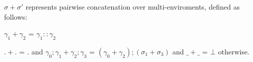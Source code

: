 

$\sigma + \sigma'$ represents pairwise concatenation over multi-enviroments,
defined as follows:

\begin{definition}
  $\gamma_1 + \gamma_2$ = $\gamma_1 :: \gamma_2 $
\end{definition}

\begin{definition}
  $. + .$ = $ . $ and $\gamma_0;\gamma_1 + \gamma_2;\gamma_3$ = $(\gamma_0 +
  \gamma_2);(\sigma_1 + \sigma_3)$ and $\_ + \_$ = $\bot$ otherwise.
\end{definition}

